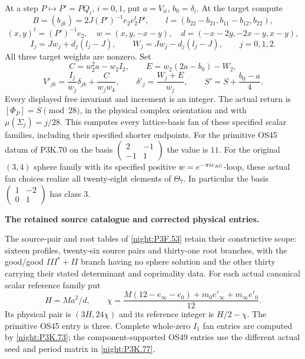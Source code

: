 \begin{theorem}
At a step \(P\mapsto P'=PQ_i\), \(i=0,1\), put
\(a=V_{ii}\), \(b_0=\delta_i\). At the target compute
\[
 B=(b_{jk})=2J(P')^{-1}e_2e_2^tP',\qquad
 l=(b_{22}-b_{21},b_{11}-b_{12},b_{22}),
\]
\[
 (x,y)^t=(P')^{-1}e_2,\quad
 w=(x,y,-x-y),\quad d=(-x-2y,-2x-y,x-y),
\]
\[
 I_j=Jw_j+d_j(l_j-J),\qquad
 W_j=Jw_j-d_j(l_j-J),\qquad j=0,1,2.
 \tag{P3K.73.3}
\]
All three target weights are nonzero. Set
\[
 C=w_2^2a-w_2I_2,\qquad E=w_2(2a-b_0)-W_2,
\]
\[
 V'_{jk}=\frac{I_j}{w_j}\delta_{jk}+\frac{C}{w_jw_k},
 \qquad \delta'_j=\frac{W_j+E}{w_j},\qquad
 S'=S+\frac{b_0-a}{4}.
 \tag{P3K.73.4}
\]
Every displayed free invariant and increment is an integer.
The actual return is \([\Phi_P]=S\pmod{28}\), in the physical
complex orientation and with \(\mu(\Sigma_j)=j/28\).
This computes every lattice-basis fan of these specified scalar
families, including their specified shorter endpoints. For the
primitive OS45 datum of P3K.70 on the basis
\(\left(\begin{smallmatrix}2&-1\\-1&1\end{smallmatrix}\right)\)
the value is \(11\).
For the original \((3,4)\) sphere family with its specified positive
\(w=e^{-\pi i c_{\rm AC}}\)-loop, these actual fan choices realize
all twenty-eight elements of \(\Theta_7\). In particular the basis
\(\left(\begin{smallmatrix}1&-2\\0&1\end{smallmatrix}\right)\)
has class \(3\).
\end{theorem}

\begin{proposition}\hypertarget{tag-01TY}{}\label{iv:correction:P3F.53}

\textbf{The retained source catalogue and corrected physical entries.}\par
The source-pair and root tables of \cref{night:P3F.53}
retain their constructive scope: sixteen profiles, twenty-six
source pairs and thirty-one root branches, with the good/good
\(III^*+II\) branch having no sphere solution and the other
thirty carrying their stated determinant and coprimality data.
For each actual canonical scalar reference family put
\[
 H=Ma^2/d,\qquad
 \chi=\frac{M(12-e_\infty-e_0)+m_0e'_\infty+m_\infty e'_0}{12}.
\]
Its physical pair is \((3H,24\chi)\) and its reference integer
is \(H/2-\chi\). The primitive OS45 entry is three.
Complete whole-zero \(I_1\) fan entries are computed by
\cref{night:P3K.73}; the component-supported OS49 entries use
the different actual seed and period matrix in \cref{night:P3K.77}.
\end{proposition}

